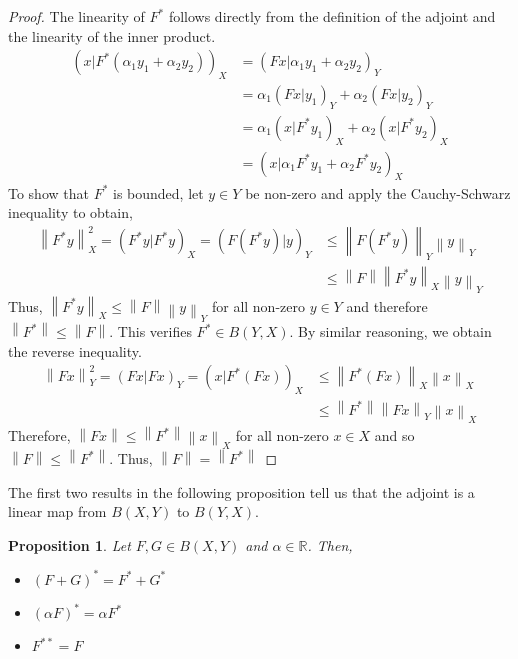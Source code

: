 \documentclass[12pt]{article}
\newcommand*{\norm}[1]{\left\lVert#1\right\rVert}
\newtheorem*{prop}{Proposition}
\begin{document}
\begin{proof} 
The linearity of $F^*$ follows directly from the definition of the adjoint and the linearity of the inner product. 
\begin{align*} 
(x|F^*(\alpha_1 y_1 + \alpha_2 y_2))_X &= (Fx|\alpha_1 y_1 + \alpha_2 y_2)_Y \\
                                                               &= \alpha_1(Fx|y_1)_Y + \alpha_2(Fx|y_2)_Y \\
                                                               &= \alpha_1(x|F^*y_1)_X + \alpha_2(x|F^*y_2)_X \\
                                                               &= (x|\alpha_1 F^*y_1 + \alpha_2 F^*y_2)_X
\end{align*} 
To show that $F^*$ is bounded, let $y \in Y$ be non-zero and apply the Cauchy-Schwarz inequality to obtain,
\begin{align*} 
\norm{F^*y}^2_X = (F^*y|F^*y)_X = (F(F^*y)|y)_Y &\leq \norm{F(F^*y)}_Y\norm{y}_Y \\
                                                                               &\leq \norm{F}\norm{F^*y}_X\norm{y}_Y
\end{align*}
Thus, $\norm{F^*y}_X \leq \norm{F}\norm{y}_Y$ for all non-zero $y \in Y$ and therefore $\norm{F^*} \leq \norm{F}$. 
This verifies $F^* \in B(Y, X)$. By similar reasoning, we obtain the reverse inequality. 
\begin{align*} 
\norm{Fx}^2_Y = (Fx|Fx)_Y = (x|F^*(Fx))_X &\leq \norm{F^*(Fx)}_X\norm{x}_X \\
                                                                      &\leq \norm{F^*}\norm{Fx}_Y\norm{x}_X
\end{align*}
Therefore, $\norm{Fx} \leq \norm{F^*}\norm{x}_X$ for all non-zero $x \in X$ and so $\norm{F} \leq \norm{F^*}$. 
Thus, $\norm{F} = \norm{F^*}$
\end{proof} 

The first two results in the following proposition tell us that the adjoint is a linear map from $B(X, Y)$
to $B(Y, X)$.

\begin{prop} 
Let $F, G \in B(X, Y)$ and $\alpha \in \mathbb{R}$. Then,
\begin{itemize}
\item $(F + G)^* = F^* + G^*$
\item $(\alpha F)^* = \alpha F^*$
\item $F^{**} = F$
\end{itemize}  
\end{prop}
\end{document}
